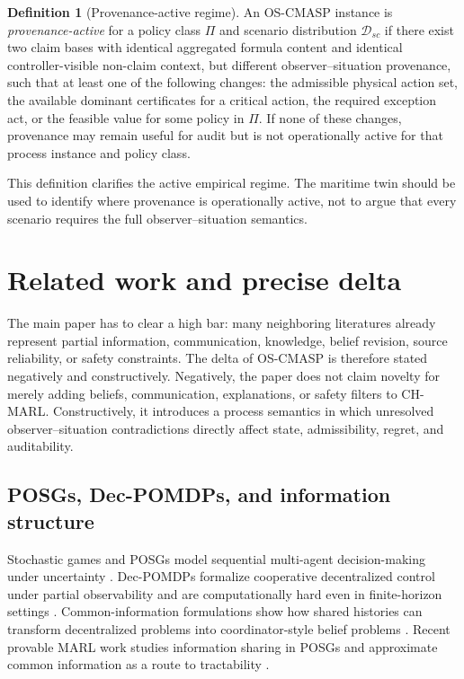 \documentclass[11pt]{article}
\newcommand{\OSCMASP}{\mbox{\normalfont\textsc{OS-CMASP}}}
\newcommand{\1}{\mathbf{1}}
\theoremstyle{definition}
\newtheorem{definition}{Definition}[section]
\theoremstyle{plain}
\theoremstyle{remark}
\begin{document}
\begin{definition}[Provenance-active regime]
\label{def:provenance-active-regime-main}
An \OSCMASP{} instance is \emph{provenance-active} for a policy class $\Pi$ and scenario distribution $\mathcal D_{sc}$ if there exist two claim bases with identical aggregated formula content and identical controller-visible non-claim context, but different observer--situation provenance, such that at least one of the following changes: the admissible physical action set, the available dominant certificates for a critical action, the required exception act, or the feasible value for some policy in $\Pi$. If none of these changes, provenance may remain useful for audit but is not operationally active for that process instance and policy class.
\end{definition}

This definition clarifies the active empirical regime. The maritime twin should be used to identify where provenance is operationally active, not to argue that every scenario requires the full observer--situation semantics.


\section{Related work and precise delta}
\label{sec:related}

The main paper has to clear a high bar: many neighboring literatures already represent partial information, communication, knowledge, belief revision, source reliability, or safety constraints. The delta of \OSCMASP{} is therefore stated negatively and constructively. Negatively, the paper does not claim novelty for merely adding beliefs, communication, explanations, or safety filters to CH-MARL. Constructively, it introduces a process semantics in which unresolved observer--situation contradictions directly affect state, admissibility, regret, and auditability.

\subsection{POSGs, Dec-POMDPs, and information structure}

Stochastic games and POSGs model sequential multi-agent decision-making under uncertainty \citep{Shapley1953,Littman1994}. Dec-POMDPs formalize cooperative decentralized control under partial observability and are computationally hard even in finite-horizon settings \citep{Bernstein2002,OliehoekAmato2016}. Common-information formulations show how shared histories can transform decentralized problems into coordinator-style belief problems \citep{Nayyar2013}. Recent provable MARL work studies information sharing in POSGs and approximate common information as a route to tractability \citep{LiuZhang2023InfoSharing}.
\end{document}
